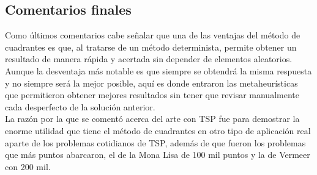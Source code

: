 \subsection {Comentarios finales}
Como últimos comentarios cabe señalar que una de las ventajas del método de cuadrantes es que, al tratarse de un método determinista, permite obtener un resultado de manera rápida y acertada sin depender de elementos aleatorios. Aunque la desventaja más notable es que siempre se obtendrá la misma respuesta y no siempre será la mejor posible, aquí es donde entraron las metaheurísticas que permitieron obtener mejores resultados sin tener que revisar manualmente cada desperfecto de la solución anterior.\\
\hspace*{1cm}La razón por la que se comentó acerca del arte con TSP fue para demostrar la enorme utilidad que tiene el método de cuadrantes en otro tipo de aplicación real aparte de los problemas cotidianos de TSP, además de que fueron los problemas que más puntos abarcaron, el de la Mona Lisa de 100 mil puntos y la de Vermeer con 200 mil.\\
\clearpage \newpage
